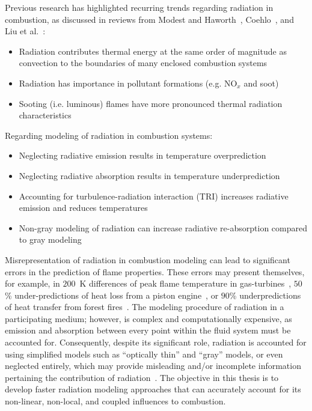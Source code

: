 Previous research has highlighted recurring trends regarding radiation in combustion, as discussed in reviews from Modest and Haworth~\cite{Modest2016RadiativeSystems}, Coehlo~\cite{Coelho2018RadiativeSystems}, and Liu et al.~\cite{Liu2020TheFlames}:
\begin{itemize}
    \item Radiation contributes thermal energy at the same order of magnitude as convection to the boundaries of many enclosed combustion systems~\cite{Gamil2020AssessmentChamber,Johnson2021AnalysisMethod}
    \item Radiation has importance in pollutant formations (e.g. NO${}_x$ and soot)~\cite{Ihme2008ModelingFormulation,Habibi2007TurbulenceFlames}
    \item Sooting (i.e. luminous) flames have more pronounced thermal radiation characteristics~\cite{Modest2016RadiativeSystems}
\end{itemize}
Regarding modeling of radiation in combustion systems:
\begin{itemize}
    \item Neglecting radiative emission results in temperature overprediction~\cite{Gamil2020AssessmentChamber}
    \item Neglecting radiative absorption results in temperature underprediction~\cite{Ren2017MonteChamber}
    \item Accounting for turbulence-radiation interaction (TRI) increases radiative emission and reduces temperatures~\cite{Coelho2018RadiativeSystems}
    \item Non-gray modeling of radiation can increase radiative re-absorption compared to gray modeling~\cite{Wu2021LimitationsFires}
\end{itemize}



Misrepresentation of radiation in combustion modeling can lead to significant errors in the prediction of flame properties. These errors may present themselves, for example, in $200$~K differences of peak flame temperature in gas-turbines~\cite{Gamil2020AssessmentChamber}, $50$\% under-predictions of heat loss from a piston engine~\cite{Modest2016RadiativeSystems}, or $90$\% underpredictions of heat transfer from forest fires~\cite{Valendik2008EffectEnvironment}.
The modeling procedure of radiation in a participating medium; however, is complex and computationally expensive, as emission and absorption between every point within the fluid system must be accounted for. Consequently, despite its significant role, radiation is accounted for using simplified models such as “optically thin” and “gray” models, or even neglected entirely, which may provide misleading and/or incomplete information pertaining the contribution of radiation~\cite{Liu2020TheFlames,Modest2016RadiativeSystems}. 
The objective in this thesis is to develop faster radiation modeling approaches that can accurately account for its non-linear, non-local, and coupled influences to combustion. 

